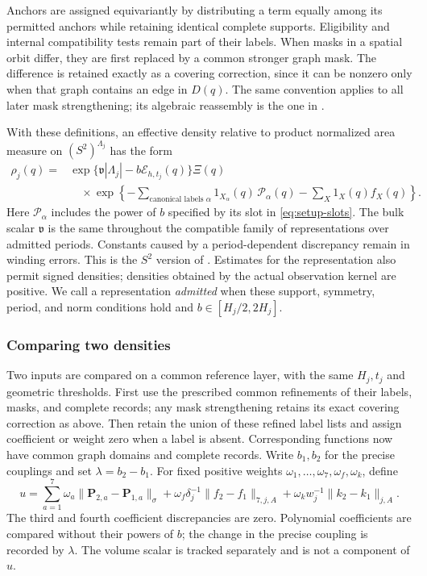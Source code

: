 Anchors are assigned equivariantly by distributing a term equally among
its permitted anchors while retaining identical complete supports.
Eligibility and internal compatibility tests remain part of their
labels.  When masks in a spatial orbit differ, they are first replaced
by a common stronger graph mask.  The difference is retained exactly
as a covering correction, since it can be nonzero only when that graph
contains an edge in $D(q)$.  The same convention applies to all later
mask strengthening; its algebraic reassembly is the one in
.

With these definitions, an effective density relative to product
normalized area measure on $(S^2)^{\Lambda_j}$ has the form
\begin{equation}
 \begin{aligned}
 \rho_j(q)={}&\exp\{\mathfrak v|\Lambda_j|-b\mathcal E_{h,t_j}(q)\}\Xi(q)\\
 &\quad\times
 \exp\left\{-\sum_{\text{canonical labels }\alpha}
                         1_{X_\alpha}(q)\,\mathcal P_\alpha(q)
       -\sum_X1_X(q)f_X(q)\right\}.
 \end{aligned}
 \label{eq:setup-effective-density}
\end{equation}
Here $\mathcal P_\alpha$ includes the power of $b$ specified by its
slot in \eqref{eq:setup-slots}.  The bulk scalar $\mathfrak v$ is the same throughout the compatible
family of representations over admitted periods.  Constants caused
by a period-dependent discrepancy remain in winding errors.  This is
the $S^2$ version of .  Estimates for the representation
also permit signed densities; densities obtained by the actual
observation kernel are positive.  We call a representation \emph{admitted}
when these support, symmetry, period, and norm conditions hold and
$b\in[H_j/2,2H_j]$.

\subsubsection{Comparing two densities}

Two inputs are compared on a common reference layer, with the same
$H_j,t_j$ and geometric thresholds.  First use the prescribed common
refinements of their labels, masks, and complete records; any mask
strengthening retains its exact covering correction as above.  Then
retain the union of these refined label lists and assign coefficient or
weight zero when a label is absent.  Corresponding functions now have
common graph domains and complete records.  Write $b_1,b_2$ for the precise
couplings and set $\lambda=b_2-b_1$.  For fixed positive weights
$\omega_1,\ldots,\omega_7,\omega_f,\omega_k$, define
\begin{equation}
 u=\sum_{a=1}^7\omega_a
          \|\mathbf P_{2,a}-\mathbf P_{1,a}\|_\sigma
    +\omega_f\delta_j^{-1}\|f_2-f_1\|_{7,j,A}
    +\omega_kw_j^{-1}\|k_2-k_1\|_{j,A}.
 \label{eq:setup-density-discrepancy}
\end{equation}
The third and fourth coefficient discrepancies are zero.  Polynomial
coefficients are compared without their powers of $b$; the change in
the precise coupling is recorded by $\lambda$.  The volume scalar is
tracked separately and is not a component of $u$.

